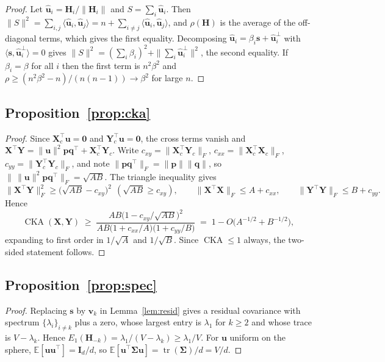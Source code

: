 \documentclass{article}
\theoremstyle{spaced}
\theoremstyle{definition}
\DeclareMathOperator{\CKA}{CKA}
\DeclareMathOperator{\tr}{tr}
\newcommand{\bH}{\mathbf{H}}
\newcommand{\bs}{\mathbf{s}}
\newcommand{\bu}{\mathbf{u}}
\newcommand{\bv}{\mathbf{v}}
\newcommand{\bX}{\mathbf{X}}
\newcommand{\bY}{\mathbf{Y}}
\newcommand{\bI}{\mathbf{I}}
\newcommand{\bSig}{\boldsymbol{\Sigma}}
\begin{document}
\begin{proof}
Let $\hat{\bu}_i = \bH_i/\|\bH_i\|$ and $S = \sum_i \hat{\bu}_i$. Then $\|S\|^2 = \sum_{i,j}\langle\hat{\bu}_i,\hat{\bu}_j\rangle = n + \sum_{i \ne j}\langle\hat{\bu}_i,\hat{\bu}_j\rangle$, and $\rho(\bH)$ is the average of the off-diagonal terms, which gives the first equality. Decomposing $\hat{\bu}_i = \beta_i\bs + \hat{\bu}_i^\perp$ with $\langle\bs,\hat{\bu}_i^\perp\rangle = 0$ gives $\|S\|^2 = (\sum_i\beta_i)^2 + \|\sum_i\hat{\bu}_i^\perp\|^2$, the second equality. If $\beta_i = \beta$ for all $i$ then the first term is $n^2\beta^2$ and $\rho \ge (n^2\beta^2 - n)/(n(n-1)) \to \beta^2$ for large $n$.
\end{proof}

\subsection{Proposition~\ref{prop:cka}}

\begin{proof}
Since $\bX_c^\top\bu = \mathbf{0}$ and $\bY_c^\top\bu = \mathbf{0}$, the cross terms vanish and $\bX^\top\bY = \|\bu\|^2\mathbf{p}\mathbf{q}^\top + \bX_c^\top\bY_c$. Write $c_{xy} = \|\bX_c^\top\bY_c\|_F$, $c_{xx} = \|\bX_c^\top\bX_c\|_F$, $c_{yy} = \|\bY_c^\top\bY_c\|_F$, and note $\|\mathbf{p}\mathbf{q}^\top\|_F = \|\mathbf{p}\|\|\mathbf{q}\|$, so $\|\,\|\bu\|^2\mathbf{p}\mathbf{q}^\top\|_F = \sqrt{AB}$. The triangle inequality gives
\[
\|\bX^\top\bY\|_F^2 \ge \big(\sqrt{AB} - c_{xy}\big)^2 \ \ (\sqrt{AB} \ge c_{xy}), \qquad
\|\bX^\top\bX\|_F \le A + c_{xx}, \qquad \|\bY^\top\bY\|_F \le B + c_{yy}.
\]
Hence
\[
\CKA(\bX,\bY) \;\ge\; \frac{AB\big(1 - c_{xy}/\sqrt{AB}\big)^2}{AB\big(1+c_{xx}/A\big)\big(1+c_{yy}/B\big)}
\;=\; 1 - O\big(A^{-1/2} + B^{-1/2}\big),
\]
expanding to first order in $1/\sqrt{A}$ and $1/\sqrt{B}$. Since $\CKA \le 1$ always, the two-sided statement follows.
\end{proof}

\subsection{Proposition~\ref{prop:spec}}

\begin{proof}
Replacing $\bs$ by $\bv_k$ in Lemma~\ref{lem:resid} gives a residual covariance with spectrum $\{\lambda_i\}_{i \ne k}$ plus a zero, whose largest entry is $\lambda_1$ for $k \ge 2$ and whose trace is $V - \lambda_k$. Hence $E_1(\bH_{-k}) = \lambda_1/(V-\lambda_k) \ge \lambda_1/V$. For $\bu$ uniform on the sphere, $\mathbb{E}[\bu\bu^\top] = \bI_d/d$, so $\mathbb{E}[\bu^\top\bSig\bu] = \tr(\bSig)/d = V/d$.
\end{proof}
\end{document}
